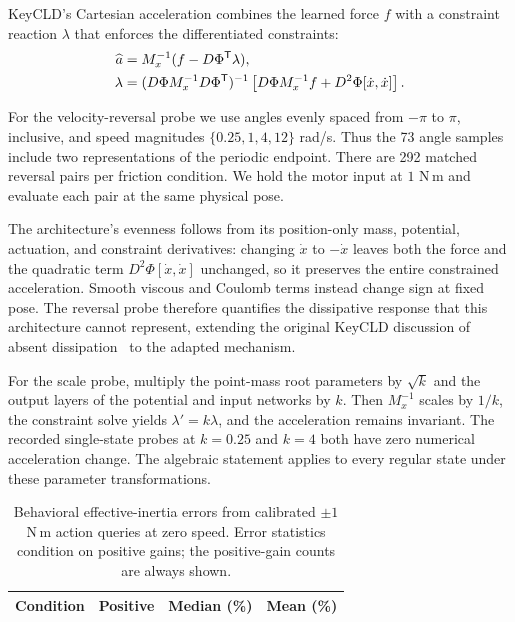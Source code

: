 \documentclass[10pt,twocolumn,letterpaper]{article}
\begin{document}
\begin{samepage}
KeyCLD's Cartesian acceleration combines the learned force $f$ with a constraint reaction $\lambda$ that enforces the differentiated constraints:
\begin{align}
\widehat a&=M_x^{-1}(f-D\Phi^{\mathsf T}\lambda),\\
\lambda&=(D\Phi M_x^{-1}D\Phi^{\mathsf T})^{-1}
\left[D\Phi M_x^{-1}f+D^2\Phi[\dot x,\dot x]\right].
\label{eq:keycld}
\end{align}
\end{samepage}
For the velocity-reversal probe we use angles evenly spaced from $-\pi$ to $\pi$, inclusive, and speed magnitudes $\{0.25,1,4,12\}$ rad/s. Thus the 73 angle samples include two representations of the periodic endpoint. There are 292 matched reversal pairs per friction condition. We hold the motor input at $1$ N\,m and evaluate each pair at the same physical pose.

The architecture's evenness follows from its position-only mass, potential, actuation, and constraint derivatives: changing $\dot x$ to $-\dot x$ leaves both the force and the quadratic term $D^2\Phi[\dot x,\dot x]$ unchanged, so it preserves the entire constrained acceleration. Smooth viscous and Coulomb terms instead change sign at fixed pose. The reversal probe therefore quantifies the dissipative response that this architecture cannot represent, extending the original KeyCLD discussion of absent dissipation~\cite{daems2024keycld} to the adapted mechanism.

For the scale probe, multiply the point-mass root parameters by $\sqrt{k}$ and the output layers of the potential and input networks by $k$. Then $M_x^{-1}$ scales by $1/k$, the constraint solve yields $\lambda' = k\lambda$, and the acceleration remains invariant. The recorded single-state probes at $k=0.25$ and $k=4$ both have zero numerical acceleration change. The algebraic statement applies to every regular state under these parameter transformations.

\begin{table}[t]
\caption{Behavioral effective-inertia errors from calibrated $\pm1$ N\,m action queries at zero speed. Error statistics condition on positive gains; the positive-gain counts are always shown.}
\centering
\small
\begin{tabular}{lrrr}
\toprule
Condition & Positive & Median (\%) & Mean (\%)\\
\midrule

\bottomrule
\end{tabular}
\end{table}
\end{document}

